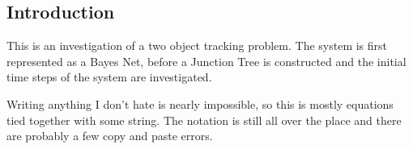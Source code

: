 \begin{center}
\section*{Introduction}
\end{center}
This is an investigation of a two object tracking problem. The system is first represented as a Bayes Net, before a Junction Tree is constructed and the initial time steps of the system are investigated.

Writing anything I don't hate is nearly impossible, so this  is mostly equations tied together with some string. The notation is still all over the place and there are probably a few copy and paste errors.